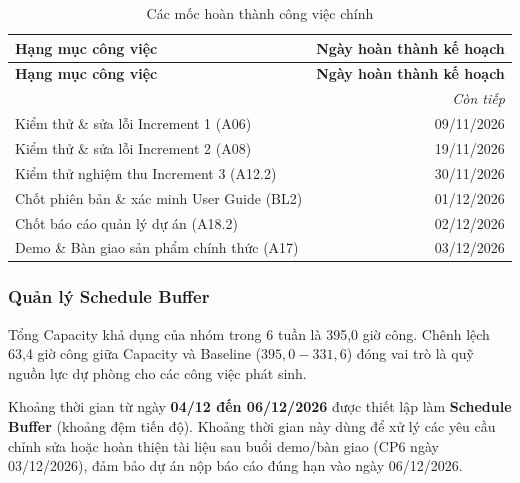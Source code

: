 \begingroup\small
\setlength{\tabcolsep}{4pt}\renewcommand{\arraystretch}{1.15}
\begin{longtable}{@{}lr@{}}
\caption{Các mốc hoàn thành công việc chính}\label{tab:revised-milestones}\\
\toprule
\textbf{Hạng mục công việc} & \textbf{Ngày hoàn thành kế hoạch} \\
\midrule\endfirsthead
\toprule
\textbf{Hạng mục công việc} & \textbf{Ngày hoàn thành kế hoạch} \\
\midrule\endhead
\midrule\multicolumn{2}{r}{\textit{Còn tiếp}}\\\endfoot
\bottomrule\endlastfoot
Kiểm thử \& sửa lỗi Increment 1 (A06) & 09/11/2026 \\
Kiểm thử \& sửa lỗi Increment 2 (A08) & 19/11/2026 \\
Kiểm thử nghiệm thu Increment 3 (A12.2) & 30/11/2026 \\
Chốt phiên bản \& xác minh User Guide (BL2) & 01/12/2026 \\
Chốt báo cáo quản lý dự án (A18.2) & 02/12/2026 \\
Demo \& Bàn giao sản phẩm chính thức (A17) & 03/12/2026 \\
\end{longtable}\endgroup

\subsubsection{Quản lý Schedule Buffer}

Tổng Capacity khả dụng của nhóm trong 6 tuần là 395,0 giờ công. Chênh lệch 63,4 giờ công giữa Capacity và Baseline ($395{,}0 - 331{,}6$) đóng vai trò là quỹ nguồn lực dự phòng cho các công việc phát sinh.

Khoảng thời gian từ ngày \textbf{04/12 đến 06/12/2026} được thiết lập làm \textbf{Schedule Buffer} (khoảng đệm tiến độ). Khoảng thời gian này dùng để xử lý các yêu cầu chỉnh sửa hoặc hoàn thiện tài liệu sau buổi demo/bàn giao (CP6 ngày 03/12/2026), đảm bảo dự án nộp báo cáo đúng hạn vào ngày 06/12/2026.